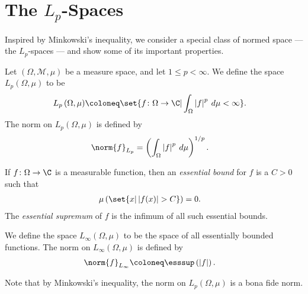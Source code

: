 \documentclass[12pt]{mypackage}
\begin{document}
\section{The $L_p$-Spaces}%
Inspired by Minkowski's inequality, we consider a special class of normed space --- the $L_p$-spaces --- and show some of its important properties.
\begin{definition}
  Let $\left( \Omega,\mathcal{M},\mu \right)$ be a measure space, and let $1 \leq p < \infty$. We define the space $L_p\left( \Omega,\mu \right)$ to be
  \begin{align*}
    L_p\left( \Omega,\mu \right) &\coloneq \set{f\colon \Omega\rightarrow \C | \int_{\Omega}^{} \left\vert f \right\vert^{p}\:d\mu < \infty}.
  \end{align*}
  The norm on $L_p\left( \Omega,\mu \right)$ is defined by
  \begin{align*}
    \norm{f}_{L_p} &= \left( \int_{\Omega}^{} \left\vert f \right\vert^{p}\:d\mu \right)^{1/p}.
  \end{align*}
\end{definition}
\begin{definition}
  If $f\colon \Omega\rightarrow \C$ is a measurable function, then an \textit{essential bound} for $f$ is a $C > 0$ such that
  \begin{align*}
    \mu\left( \set{x | \left\vert f(x) \right\vert > C} \right) &= 0.
  \end{align*}
  The \textit{essential supremum} of $f$ is the infimum of all such essential bounds.\newline

  We define the space $L_{\infty}\left( \Omega,\mu \right)$ to be the space of all essentially bounded functions. The norm on $L_{\infty}\left( \Omega,\mu \right)$ is defined by
  \begin{align*}
    \norm{f}_{L_{\infty}} &\coloneq \esssup\left( \left\vert f \right\vert \right).
  \end{align*}
\end{definition}

Note that by Minkowski's inequality, the norm on $L_p\left( \Omega,\mu \right)$ is a bona fide norm.\newline
\end{document}
